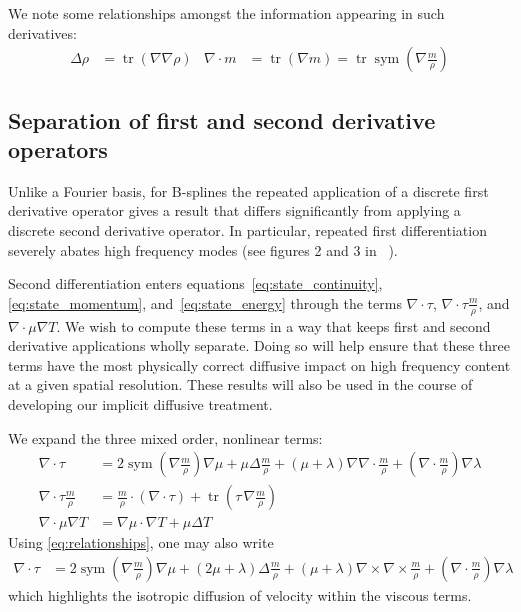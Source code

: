 \documentclass[letterpaper,11pt,nointlimits,reqno,draft]{amsart}
\newcommand{\symmetricpart}[1]
  {\ensuremath{\operatorname{sym}\left(#1\right)}}
\DeclareMathOperator{\trace}{tr}
\begin{document}
We note some relationships amongst the information appearing in such
derivatives:
\begin{align}\label{eq:relationships}
  \Delta\rho
  &=
  \trace\left( \nabla\nabla\rho \right)
&
  \nabla\cdot{}m
  &=
  \trace\left(\nabla{}m\right)
  =
  \trace\symmetricpart{\nabla\frac{m}{\rho}}
\end{align}

\subsection{Separation of first and second derivative operators}
\label{sec:separate_first_second_deriv}

Unlike a Fourier basis, for B-splines the repeated application of a discrete
first derivative operator gives a result that differs significantly from
applying a discrete second derivative operator.  In particular, repeated first
differentiation severely abates high frequency modes (see figures 2 and 3 in
~\cite{Kwok2001}).

Second differentiation enters equations~\eqref{eq:state_continuity},
\eqref{eq:state_momentum}, and~\eqref{eq:state_energy} through the terms
$\nabla\cdot\tau$, $\nabla\cdot\tau\frac{m}{\rho}$, and
$\nabla\cdot\mu\nabla{}T$.  We wish to compute these terms in a way that keeps
first and second derivative applications wholly separate.  Doing so will help
ensure that these three terms have the most physically correct diffusive impact
on high frequency content at a given spatial resolution.  These results will
also be used in the course of developing our implicit diffusive treatment.

We expand the three mixed order, nonlinear terms:
\begin{align}
\label{eq:nabla_cdot_tau_expansion}
  \nabla\cdot\tau
  &=
    2 \symmetricpart{\nabla\frac{m}{\rho}}\nabla\mu
  + \mu \Delta\frac{m}{\rho}
  + \left(\mu+\lambda\right)\nabla\nabla\cdot\frac{m}{\rho}
  + \left(\nabla\cdot\frac{m}{\rho}\right)\nabla\lambda
\\
  \nabla\cdot\tau{}\frac{m}{\rho}
  &=
    \frac{m}{\rho}\cdot\left(\nabla\cdot\tau\right)
  + \trace\left( \tau\,\nabla\frac{m}{\rho} \right)
\\
  \nabla\cdot\mu\nabla{}T \label{eq:mu_delta_T}
  &=
    \nabla\mu\cdot\nabla{}T
  + \mu \Delta{}T
\end{align}
Using \eqref{eq:relationships}, one may also write
\begin{align}\label{eq:nabla_cdot_tau_expansion_alt}
  \nabla\cdot\tau
  &=
    2 \symmetricpart{\nabla\frac{m}{\rho}}\nabla\mu
  + \left(2\mu+\lambda\right) \Delta\frac{m}{\rho}
  + \left(\mu+\lambda\right)\nabla\times\nabla\times\frac{m}{\rho}
  + \left(\nabla\cdot\frac{m}{\rho}\right)\nabla\lambda
\end{align}
which highlights the isotropic diffusion of velocity within the viscous terms.
\end{document}
